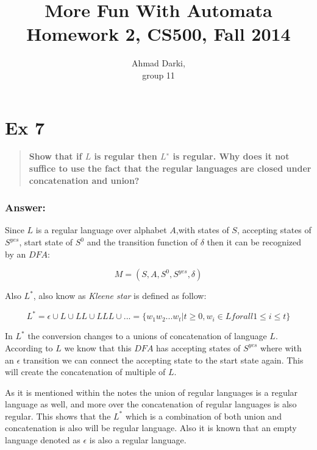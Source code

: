 \documentclass[titlepage]{article}\usepackage[]{graphicx}\usepackage[]{color}
\begin{document}
\title{More Fun With Automata \\ Homework 2, CS500, Fall 2014}
\author{Ahmad Darki, \\ group 11}
\maketitle


\section*{Ex 7}
\begin{quote}
  \textbf{Show that if $L$ is regular then $L^∗$ is regular. Why does it not suffice
  to use the fact that the regular languages are closed under concatenation and
  union?}
\end{quote}
\subsubsection*{Answer:}

Since $L$ is a regular language over alphabet $A$,with states of $S$, accepting states of $S^{yes}$, start state of $S^0$ and the transition function of $\delta$ then it can be recognized by an $DFA$:

\[ 
  M = (S, A, S^0, S^{yes}, \delta)
\]

Also $L^*$, also know as \textit{Kleene star} is defined as follow:

\[
  L^* = \epsilon \cup L \cup LL \cup LLL \cup ... = \{w_1w_2...w_t | t \geq 0, w_i \in L for all 1 \leq i \leq t\}
\]

In $L^*$ the conversion changes to a unions of concatenation of language $L$. According to $L$ we know that this $DFA$ has accepting states of $S^{yes}$ where with an $\epsilon$ transition we can connect the accepting state to the start state again. This will create the concatenation of multiple of $L$.

As it is mentioned within the notes the union of regular languages is a regular language as well, and more over the concatenation of regular languages is also regular. This shows that the $L^*$ which is a combination of both union and concatenation is also will be regular language. Also it is known that an empty language denoted as $\epsilon$ is also a regular language.

\vspace{1cm}


\end{document}
